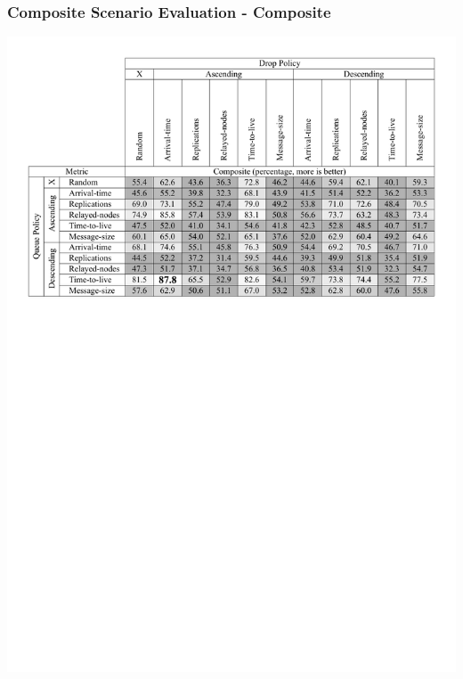 \begin{frame}
  \frametitle{Composite Scenario Evaluation - Composite}
  \begin{center}
   \includegraphics[width=1.0\textwidth]{fig/tables/scenario4_part4.pdf}
  \end{center}
\end{frame}